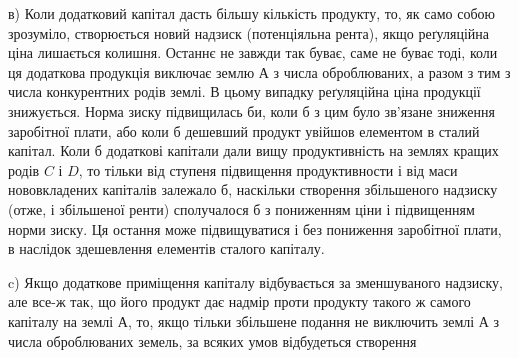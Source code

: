 в) Коли додатковий капітал дасть більшу кількість продукту, то, як само
собою зрозуміло, створюється новий надзиск (потенціяльна рента), якщо реґуляційна
ціна лишається колишня. Останнє не завжди так буває, саме не буває
тоді, коли ця додаткова продукція виключає землю $А$ з числа оброблюваних, а
разом з тим з числа конкурентних родів землі. В цьому випадку реґуляційна ціна
продукції знижується. Норма зиску підвищилась би, коли б з цим було зв’язане
зниження заробітної плати, або коли б дешевший продукт увійшов елементом
в сталий капітал. Коли б додаткові капітали дали вищу продуктивність на
землях кращих родів $C$ і $D$, то тільки від ступеня підвищення продуктивности
і від маси нововкладених капіталів залежало б, наскільки створення збільшеного
надзиску (отже, і збільшеної ренти) сполучалося б з пониженням ціни і підвищенням
норми зиску. Ця остання може підвищуватися і без пониження заробітної
плати, в наслідок здешевлення елементів сталого капіталу.

c) Якщо додаткове приміщення капіталу відбувається за зменшуваного
надзиску, але все-ж так, що його продукт дає надмір проти продукту такого ж
самого капіталу на землі $А$, то, якщо тільки збільшене подання не виключить
землі $А$ з числа оброблюваних земель, за всяких умов відбудеться створення
\parbreak{}  %
